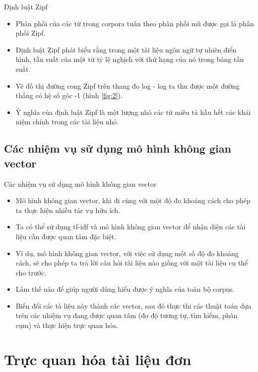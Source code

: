 \documentclass[10pt]{beamer}
\theoremstyle{remark}
\theoremstyle{definition}
\begin{document}
\begin{frame}{Định luật Zipf}
	\begin{itemize}
		\item Phân phối của các từ trong corpora tuân theo phân phối mũ được gọi là phân phối Zipf.
		\item Định luật Zipf \cite{490} phát biểu rằng trong một tài liệu ngôn ngữ tự nhiên điển hình, tần suất của một từ tỷ lệ nghịch với thứ hạng của nó trong bảng tần suất.
		\item Vẽ đồ thị đường cong Zipf trên thang đo log - log ta thu được một đường thẳng có hệ số góc -1 (hình \ref{fig:2}).
		\item Ý nghĩa của định luật Zipf là một lượng nhỏ các từ miêu tả hầu hết các khái niệm chính trong các tài liệu nhỏ.
	\end{itemize}
\end{frame}

\subsection{Các nhiệm vụ sử dụng mô hình không gian vector}

\begin{frame}{Các nhiệm vụ sử dụng mô hình không gian vector}
	\begin{itemize}
		\item Mô hình không gian vector, khi đi cùng với một độ đo khoảng cách cho phép ta thực hiện nhiều tác vụ hữu ích.
		\item Ta có thể sử dụng tf-idf và mô hình không gian vector để nhận diện các tài liệu cần được quan tâm đặc biệt.
		\item Ví dụ, mô hình không gian vector, với việc sử dụng một số độ đo khoảng cách, sẽ cho phép ta trả lời câu hỏi tài liệu nào giống với một tài liệu cụ thể cho trước.
		\item Làm thế nào để giúp người dùng hiểu được ý nghĩa của toàn bộ corpus.
		\item Biến đổi các tà liệu này thành các vector, sau đó thực thi các thuật toán dựa trên các nhiệm vụ đang được quan tâm (đo độ tương tự, tìm kiếm, phân cụm) và thực hiện trực quan hóa.
	\end{itemize}
\end{frame}

\section{Trực quan hóa tài liệu đơn}
\end{document}
